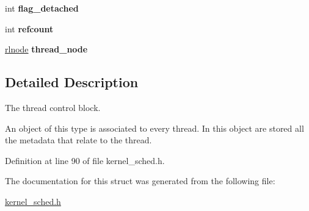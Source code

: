 \begin{DoxyCompactItemize}
\mbox{\label{structprocess__thread__control__block_a5c73cb27a0e903385c3ce2ed0c45d0f1}} 
int {\bfseries flag\+\_\+detached}
\item 
\mbox{\label{structprocess__thread__control__block_af600ec6bb692b636bffaba41df739883}} 
int {\bfseries refcount}
\item 
\mbox{\label{structprocess__thread__control__block_aa2032e587ad7c485b380870951e9e8c6}} 
\hyperlink{group__rlists_ga8f6244877f7ce2322c90525217ea6e7a}{rlnode} {\bfseries thread\+\_\+node}
\end{DoxyCompactItemize}


\subsection{Detailed Description}
The thread control block. 

An object of this type is associated to every thread. In this object are stored all the metadata that relate to the thread. 

Definition at line 90 of file kernel\+\_\+sched.\+h.



The documentation for this struct was generated from the following file\+:\begin{DoxyCompactItemize}
\item 
\hyperlink{kernel__sched_8h}{kernel\+\_\+sched.\+h}\end{DoxyCompactItemize}
